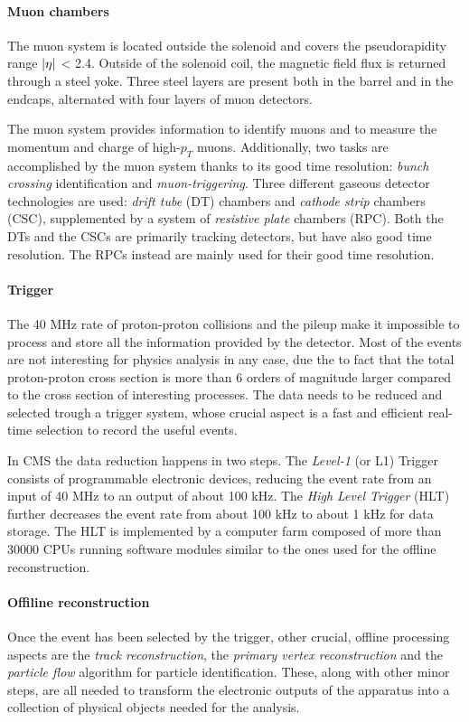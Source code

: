 \paragraph{Muon chambers}

The muon system is located outside the solenoid and covers the pseudorapidity range
$\abs{\eta}$ < 2.4. Outside of the solenoid coil, the magnetic field flux is returned through a steel
yoke. Three steel layers are present both in the barrel and in the endcaps, alternated with
four layers of muon detectors.


The muon system provides information to identify muons and to measure the momentum
and charge of high-$p_T$ muons. Additionally, two tasks are accomplished by the muon system thanks to its good time resolution: \emph{bunch crossing} identification and \emph{muon-triggering}.
Three different gaseous detector technologies are used: \emph{drift tube} (DT) chambers and \emph{cathode strip} chambers (CSC), supplemented by a system of \emph{resistive plate} chambers (RPC). Both the DTs and the CSCs are primarily tracking detectors, but have also
good time resolution. The RPCs instead are mainly used for their good time resolution.


\paragraph{Trigger}

The 40 MHz rate of proton-proton collisions and the pileup make it impossible to process
and store all the information provided by the detector. Most of the events are not interesting
for physics analysis in any case, due the to fact that the total proton-proton cross section
is more than 6 orders of magnitude larger compared to the cross section of interesting processes. The data needs to be reduced and selected trough a trigger system, whose crucial
aspect is a fast and efficient real-time selection to record the useful events.

In CMS the data reduction happens in two steps. The \emph{Level-1} (or L1) Trigger consists of programmable electronic devices, reducing  the event rate from an input of 40 MHz to an output of about 100 kHz. The
\emph{High Level Trigger} (HLT) further decreases the event rate from about 100 kHz to about 1 kHz for data storage. The HLT is implemented by a computer farm composed of more than 30000 CPUs
running software modules similar to the ones used for the offline reconstruction. 

\paragraph{Offiline reconstruction}\label{sec:offreco}
Once the event has been selected by the trigger, other crucial, offline processing aspects are the \emph{track reconstruction}, the \emph{primary vertex reconstruction} and the \emph{particle flow} algorithm for particle identification. These, along with other minor steps, are all needed to transform the electronic outputs of the apparatus into a collection of physical objects needed for the analysis.

